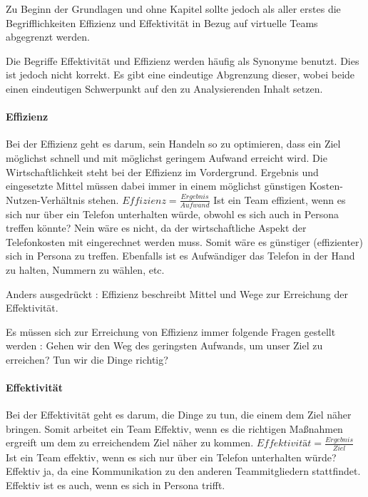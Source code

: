 \documentclass[a4paper,11pt]{article}%
\renewcommand{\\}{\vspace*{0.5\baselineskip} \newline}
\begin{document}
Zu Beginn der Grundlagen und ohne Kapitel sollte jedoch als aller erstes die Begrifflichkeiten \dq{}Effizienz\dq{} und \dq{}Effektivität\dq{} in Bezug auf virtuelle Teams abgegrenzt werden.

Die Begriffe Effektivität und Effizienz werden häufig als Synonyme benutzt. Dies ist jedoch nicht korrekt. Es gibt eine eindeutige Abgrenzung dieser, wobei beide einen eindeutigen Schwerpunkt auf den zu Analysierenden Inhalt setzen.

\paragraph{Effizienz}
Bei der Effizienz geht es darum, sein Handeln so zu optimieren, dass ein Ziel möglichst schnell und mit möglichst geringem Aufwand erreicht wird. Die Wirtschaftlichkeit steht bei der Effizienz im Vordergrund. Ergebnis und eingesetzte Mittel müssen dabei immer in einem möglichst günstigen Kosten-Nutzen-Verhältnis stehen.\\
$Effizienz = \frac{Ergebnis}{Aufwand}$\\
Ist ein Team effizient, wenn es sich nur über ein Telefon unterhalten würde, obwohl es sich auch in Persona treffen könnte?
Nein wäre es nicht, da der wirtschaftliche Aspekt der Telefonkosten mit eingerechnet werden muss. Somit wäre es günstiger (effizienter) sich in Persona zu treffen. Ebenfalls ist es Aufwändiger das Telefon in der Hand zu halten, Nummern zu wählen, etc.

Anders ausgedrückt : Effizienz beschreibt Mittel und Wege zur Erreichung der Effektivität.

Es müssen sich zur Erreichung von Effizienz immer folgende Fragen gestellt werden :
Gehen wir den Weg des geringsten Aufwands, um unser Ziel zu erreichen?
Tun wir die Dinge richtig?

\paragraph{Effektivität}
Bei der Effektivität geht es darum, die Dinge zu tun, die einem dem Ziel näher bringen. 
Somit arbeitet ein Team Effektiv, wenn es die richtigen Maßnahmen ergreift um dem zu erreichendem Ziel näher zu kommen.\\
$Effektivität = \frac{Ergebnis}{Ziel}$ \\
Ist ein Team effektiv, wenn es sich nur über ein Telefon unterhalten würde?
Effektiv ja, da eine Kommunikation zu den anderen Teammitgliedern stattfindet.
Effektiv ist es auch, wenn es sich in Persona trifft.
\end{document}
